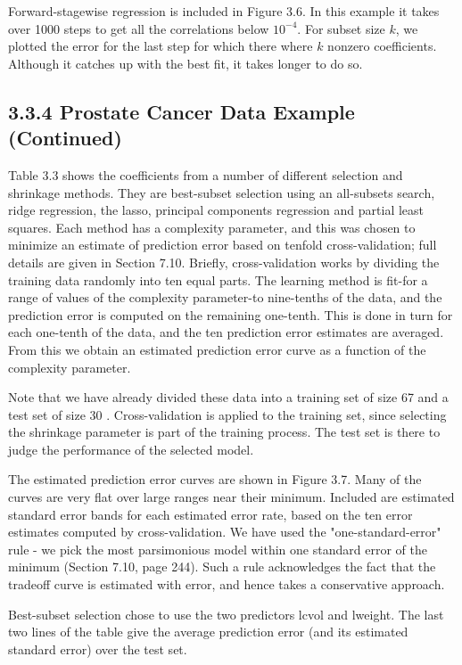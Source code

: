 \documentclass[10pt]{article}
\begin{document}
Forward-stagewise regression is included in Figure 3.6. In this example it takes over 1000 steps to get all the correlations below $10^{-4}$. For subset size $k$, we plotted the error for the last step for which there where $k$ nonzero coefficients. Although it catches up with the best fit, it takes longer to do so.

\subsection*{3.3.4 Prostate Cancer Data Example (Continued)}
Table 3.3 shows the coefficients from a number of different selection and shrinkage methods. They are best-subset selection using an all-subsets search, ridge regression, the lasso, principal components regression and partial least squares. Each method has a complexity parameter, and this was chosen to minimize an estimate of prediction error based on tenfold cross-validation; full details are given in Section 7.10. Briefly, cross-validation works by dividing the training data randomly into ten equal parts. The learning method is fit-for a range of values of the complexity parameter-to nine-tenths of the data, and the prediction error is computed on the remaining one-tenth. This is done in turn for each one-tenth of the data, and the ten prediction error estimates are averaged. From this we obtain an estimated prediction error curve as a function of the complexity parameter.

Note that we have already divided these data into a training set of size 67 and a test set of size 30 . Cross-validation is applied to the training set, since selecting the shrinkage parameter is part of the training process. The test set is there to judge the performance of the selected model.

The estimated prediction error curves are shown in Figure 3.7. Many of the curves are very flat over large ranges near their minimum. Included are estimated standard error bands for each estimated error rate, based on the ten error estimates computed by cross-validation. We have used the "one-standard-error" rule - we pick the most parsimonious model within one standard error of the minimum (Section 7.10, page 244). Such a rule acknowledges the fact that the tradeoff curve is estimated with error, and hence takes a conservative approach.

Best-subset selection chose to use the two predictors lcvol and lweight. The last two lines of the table give the average prediction error (and its estimated standard error) over the test set.
\end{document}
